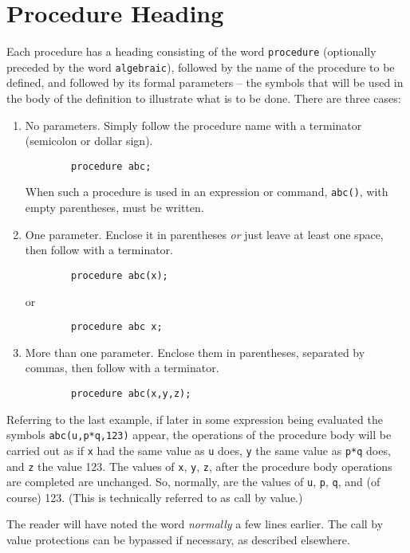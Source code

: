 \section{Procedure Heading}

Each procedure has a heading consisting of the word \texttt{procedure}
(optionally preceded by the word \texttt{algebraic}), followed by the name of
the procedure to be defined, and followed by its formal parameters -- the
symbols that will be used in the body of the definition to illustrate
what is to be done.  There are three cases:
\begin{enumerate}
\item No parameters. Simply follow the procedure name with a terminator
(semicolon or dollar sign).
\begin{verbatim}
        procedure abc;
\end{verbatim}

When such a procedure is used in an expression or command, \texttt{abc()}, with
empty parentheses, must be written.

\item One parameter.  Enclose it in parentheses \emph{or} just leave at
least one space, then follow with a terminator.
\begin{verbatim}
        procedure abc(x);
\end{verbatim}
or
\begin{verbatim}
        procedure abc x;
\end{verbatim}

\item More than one parameter. Enclose them in parentheses, separated by
commas, then follow with a terminator.
\begin{verbatim}
        procedure abc(x,y,z);
\end{verbatim}
\end{enumerate}
Referring to the last example, if later in some expression being evaluated
the symbols \texttt{abc(u,p*q,123)} appear, the operations of the procedure
body will be carried out as if \texttt{x} had the same value as \texttt{u} does,
\texttt{y} the same value as \texttt{p*q} does, and \texttt{z} the value 123.  The
values of \texttt{x}, \texttt{y}, \texttt{z}, after the procedure body operations
are completed are unchanged.  So, normally, are the values of \texttt{u},
\texttt{p}, \texttt{q}, and (of course) 123. (This is technically referred to as
call by value.)

The reader will have noted the word \emph{normally} a few lines earlier. The
call by value protections can be bypassed if necessary, as described
elsewhere.

